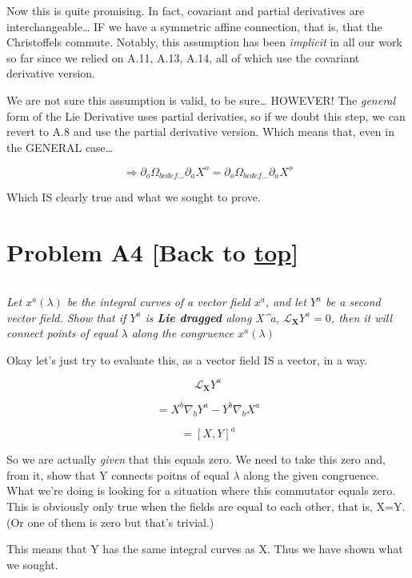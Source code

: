 \documentclass[landscape,letterpaper,10pt,english]{article}
\begin{document}
    Now this is quite promising. In fact, covariant and partial derivatives
are interchangeable\ldots{} IF we have a symmetric affine connection,
that is, that the Christoffels commute. Notably, this assumption has
been \emph{implicit} in all our work so far since we relied on A.11,
A.13, A.14, all of which use the covariant derivative version.

We are not sure this assumption is valid, to be sure\ldots{} HOWEVER!
The \emph{general} form of the Lie Derivative uses partial derivaties,
so if we doubt this step, we can revert to A.8 and use the partial
derivative version. Which means that, even in the GENERAL case\ldots{}

\[ \Rightarrow \partial_o \Omega_{bcdef...} \partial_a X^o  = \partial_o \Omega_{bcdef...}\partial_a X^o \]

Which IS clearly true and what we sought to prove.

    \hypertarget{problem-a4-back-to-top}{%
\section{\texorpdfstring{Problem A4 {[}Back to
\hyperref[toc]{top}{]}}{Problem A4 {[}Back to {]}}}\label{problem-a4-back-to-top}}

\[\label{PA4}\]

\emph{Let \(x^a(\lambda)\) be the integral curves of a vector field
\(x^a\), and let \(Y^a\) be a second vector field. Show that if \(Y^a\)
is \textbf{Lie dragged} along X\^{}a, \(\mathcal{L}_{\pmb X}Y^a = 0\),
then it will connect points of equal \(\lambda\) along the congruence
\(x^a(\lambda)\)}

Okay let's just try to evaluate this, as a vector field IS a vector, in
a way.

\[ \mathcal{L}_{\pmb X}Y^a \]

\[ = X^b \nabla_b Y^a - Y^b \nabla_b X^a \]

\[ = [X,Y]^a \]

So we are actually \emph{given} that this equals zero. We need to take
this zero and, from it, show that Y connects poitns of equal \(\lambda\)
along the given congruence. What we're doing is looking for a situation
where this commutator equals zero. This is obviously only true when the
fields are equal to each other, that is, X=Y. (Or one of them is zero
but that's trivial.)

    This means that Y has the same integral curves as X. Thus we have shown
what we sought.
\end{document}
